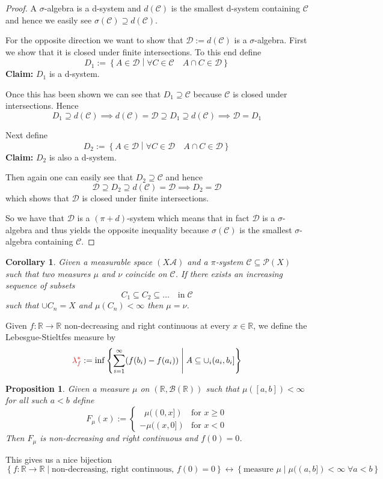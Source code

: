 \documentclass[11pt]{article}
\newcommand{\defeq}{:=}
\newcommand{\relmiddle}[1]{\mathrel{}\middle#1\mathrel{}}
\newcommand{\rmv}{\relmiddle|}
\newcommand{\R}{\mathbb{R}}
\newenvironment{defin}
	{\begin{mdframed}[backgroundcolor=white, roundcorner=5pt, linewidth=1pt]}
	{\end{mdframed}}
\newcommand{\mdf}[1]{{\color{red} #1}}
\newtheorem{prop}[theorem]{Proposition}
\newtheorem{cor}[theorem]{Corollary}
\begin{document}
\begin{proof}
A $\sigma$-algebra is a d-system and $d(\mathcal{C})$ is the smallest d-system containing $\mathcal{C}$ and hence we easily see $\sigma(\mathcal{C})\supseteq d(\mathcal{C})$.

For the opposite direction we want to show that $\mathcal{D}\defeq d(\mathcal{C})$ is a $\sigma$-algebra.
First we show that it is closed under finite intersections.
To this end define 
\[
	D_1\defeq \left\{A\in\mathcal{D} \rmv \forall C \in \mathcal{C}\quad A\cap C \in\mathcal{D}\right\}
\]
\textbf{Claim: }$D_1$ is a d-system.

Once this has been shown we can see that $D_1\supseteq\mathcal{C}$ because $\mathcal{C}$ is closed under intersections. Hence
\[
	D_1\supseteq d(\mathcal{C}) \implies d(\mathcal{C})=\mathcal{D}\supseteq D_1 \supseteq d(\mathcal{C}) \implies \mathcal{D}=D_1
\]

Next define 
\[
	D_2\defeq\left\{A\in\mathcal{D} \rmv \forall C\in\mathcal{D} \quad A\cap C\in\mathcal{D} \right\}
\]
\textbf{Claim: }$D_2$ is also a d-system.

Then again one can easily see that $D_2\supseteq\mathcal{C}$ and hence
\[
	\mathcal{D}\supseteq D_2 \supseteq d(\mathcal{C}) = \mathcal{D} \implies D_2 = \mathcal{D}
\]
which shows that $\mathcal{D}$ is closed under finite intersections.

So we have that $\mathcal{D}$ is a $(\pi+d)$-system which means that in fact $\mathcal{D}$ is a $\sigma$-algebra and thus yields the opposite inequality because $\sigma(\mathcal{C})$ is the smallest $\sigma$-algebra containing $\mathcal{C}$.
\end{proof}

\begin{cor}
	Given a measurable space $(X\mathcal{A})$ and a $\pi$-system $\mathcal{C}\subseteq\mathcal{P}(X)$ such that two measures $\mu$ and $\nu$ coincide on $\mathcal{C}$.
	If there exists an increasing sequence of subsets
	\[
		C_1 \subseteq C_2 \subseteq \dots \quad \text{in}\; \mathcal{C}
	\]
	such that $\cup C_n=X$ and $\mu(C_n)<\infty$ then $\mu= \nu$.
\end{cor}
\begin{defin}
	Given $f:\R\to\R$ non-decreasing and right continuous at every $x\in\R$, we define the \mdf{Lebesgue-Stieltfes measure} by
	\[
		\mdf{\lambda_f^\ast}\defeq\inf\left\{\sum_{i=1}^\infty (f(b_i) - f(a_i)) \rmv A \subseteq \cup_i (a_i, b_i] \right\}
	\]
	
\end{defin}
\begin{prop}
Given a measure $\mu$ on $(\R, \mathcal{B}(\R))$ such that $\mu([a, b])< \infty$ for all such $a<b$ define
\[
	F_\mu (x)\defeq
	\begin{cases}
		\;\;\mu((0, x]) & \text{for } x\geq 0 \\
		-\mu((x, 0]) & \text{for } x< 0
	\end{cases}
\]
Then $F_\mu$ is non-decreasing and right continuous and $f(0)=0$.
\end{prop}
This gives us a nice bijection
\[
	\left\{f: \R \to \R \rmv \text{non-decreasing, right continuous, }f(0)=0\right\}\leftrightarrow\left\{\text{measure }\mu \rmv \mu((a,b])<\infty\; \forall a< b\right\}
\]
\end{document}
